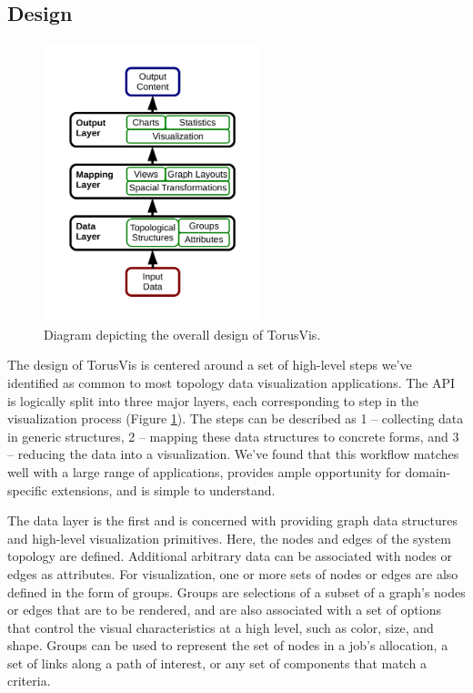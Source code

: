 \documentclass[
    10pt,
    conference,
    compsocconf
]{IEEEtran}
\begin{document}
    \subsection{Design}
        \label{subsection_design}

        \begin{figure}[!t]
            \centering
            \includegraphics[width=2.5in]{design-diagram}
            \caption{Diagram depicting the overall design of TorusVis.}
            \label{fig_design}
        \end{figure}

        The design of TorusVis is centered around a set of high-level steps
        we've identified as common to most topology data visualization
        applications.  The API is logically split into three major layers, each
        corresponding to step in the visualization process (Figure
        \ref{fig_design}).  The steps can be described as 1 -- collecting data
        in generic structures, 2 -- mapping these data structures to concrete
        forms, and 3 -- reducing the data into a visualization.  We've found
        that this workflow matches well with a large range of applications,
        provides ample opportunity for domain-specific extensions, and is simple
        to understand.

        The data layer is the first and is concerned with providing graph data
        structures and high-level visualization primitives.  Here, the nodes and
        edges of the system topology are defined.  Additional arbitrary data can
        be associated with nodes or edges as attributes.  For visualization, one
        or more sets of nodes or edges are also defined in the form of groups.
        Groups are selections of a subset of a graph's nodes or edges that are
        to be rendered, and are also associated with a set of options that
        control the visual characteristics at a high level, such as color, size,
        and shape.  Groups can be used to represent the set of nodes in a job's
        allocation, a set of links along a path of interest, or any set of
        components that match a criteria.
 
\end{document}
